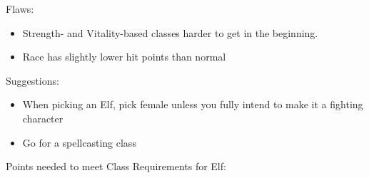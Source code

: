 \documentclass[12pt]{article}
\providecommand{\tightlist}{%
  \setlength{\itemsep}{0pt}\setlength{\parskip}{0pt}}
\begin{document}
Flaws:

\begin{itemize}
\tightlist
\item
  Strength- and Vitality-based classes harder to get in the beginning.
\item
  Race has slightly lower hit points than normal
\end{itemize}

Suggestions:

\begin{itemize}
\item
  When picking an Elf, pick female unless you fully intend to make it a
  fighting character
\item
  Go for a spellcasting class
\end{itemize}

Points needed to meet Class Requirements for Elf:
\end{document}
